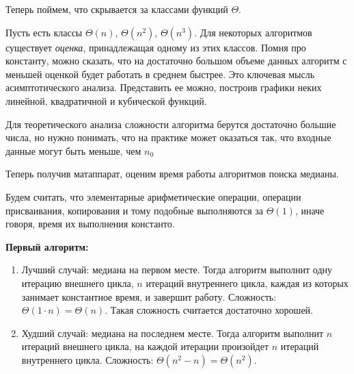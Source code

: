 \documentclass[../book.tex]{subfiles}
\begin{document}
	Теперь поймем, что скрывается за классами функций $\Theta$.
	
	Пусть есть классы $\Theta(n)$, $\Theta(n^2)$, $\Theta(n^3)$. Для некоторых алгоритмов существует \textit{оценка}, принадлежащая одному из этих классов. Помня про константу, можно сказать, что на достаточно большом объеме данных алгоритм с меньшей оценкой будет работать в среднем быстрее. Это ключевая мысль асимптотического анализа. Представить ее можно, построив графики неких линейной, квадратичной и кубической функций.
	
	
	\begin{center}
	\end{center}
	
	Для теоретического анализа сложности алгоритма берутся достаточно большие числа, но нужно понимать, что на практике может оказаться так, что входные данные могут быть меньше, чем $n_0$
	
	
	Теперь получив матаппарат, оценим время работы алгоритмов поиска медианы.
	
	\begin{remark}
		Будем считать, что элементарные арифметические операции, операции присваивания, копирования и тому подобные выполняются за $\Theta(1)$, иначе говоря, время их выполнения константо. 
	\end{remark}
	
	
	\textbf{Первый алгоритм:}
	\begin{enumerate}
		\item Лучший случай: медиана на первом месте. Тогда алгоритм выполнит одну итерацию внешнего цикла, $n$ итераций внутреннего цикла, каждая из которых занимает константное время, и завершит работу. Сложность: $\Theta(1 \cdot n) = \Theta(n)$. Такая сложность считается достаточно хорошей.
		\item Худший случай: медиана на последнем месте. Тогда алгоритм выполнит $n$ итераций внешнего цикла, на каждой итерации произойдет $n$ итераций внутреннего цикла. Сложность: $\Theta(n^2 - n) = \Theta(n^2)$. 
	\end{enumerate}
	
\end{document}
